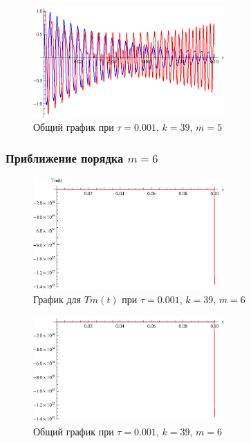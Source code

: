 \begin{figure}[h]
\begin{center}
\includegraphics[width=0.65\textwidth]{./3_results/3_11.eps}
\end{center}
\caption{Общий график при $\tau=0.001$, $k=39$, $m=5$}
\end{figure}

\newpage

\subsubsection{Приближение порядка $m=6$}

\begin{figure}[h]
\begin{center}
\includegraphics[width=0.65\textwidth]{./3_results/3_12.eps}
\end{center}
\caption{График для $Tm(t)$ при $\tau=0.001$, $k=39$, $m=6$}
\end{figure}

\begin{figure}[h]
\begin{center}
\includegraphics[width=0.65\textwidth]{./3_results/3_13.eps}
\end{center}
\caption{Общий график при $\tau=0.001$, $k=39$, $m=6$}
\end{figure}

